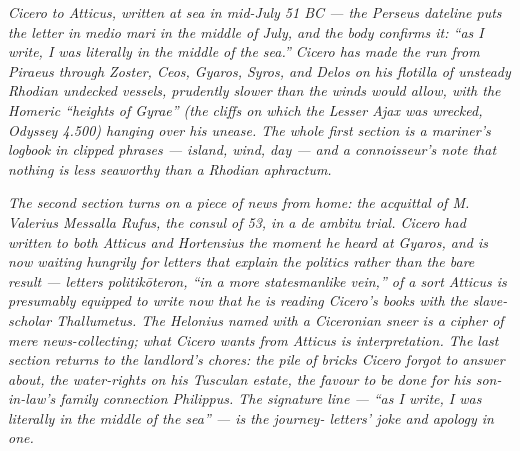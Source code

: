 
\textit{Cicero to Atticus, written at sea in mid-July 51 BC ---
the Perseus dateline puts the letter \textit{in medio mari}
in the middle of July, and the body confirms it: ``as I
write, I was literally in the middle of the sea.'' Cicero
has made the run from Piraeus through Zoster, Ceos, Gyaros,
Syros, and Delos on his flotilla of unsteady Rhodian
undecked vessels, prudently slower than the winds would
allow, with the Homeric ``heights of Gyrae'' (the cliffs
on which the Lesser Ajax was wrecked, \textit{Odyssey} 4.500)
hanging over his unease. The whole first section is a
mariner's logbook in clipped phrases --- island, wind, day
--- and a connoisseur's note that nothing is less seaworthy
than a Rhodian \textit{aphractum}.}

\textit{The second section turns on a piece of news from home:
the acquittal of M. Valerius Messalla Rufus, the consul of
53, in a \textit{de ambitu} trial. Cicero had written to
both Atticus and Hortensius the moment he heard at Gyaros,
and is now waiting hungrily for letters that explain the
politics rather than the bare result --- letters
\textit{politikōteron}, ``in a more statesmanlike vein,''
of a sort Atticus is presumably equipped to write now that
he is reading Cicero's books with the slave-scholar
Thallumetus. The Helonius named with a Ciceronian sneer is
a cipher of mere news-collecting; what Cicero wants from
Atticus is interpretation. The last section returns to the
landlord's chores: the pile of bricks Cicero forgot to
answer about, the water-rights on his Tusculan estate, the
favour to be done for his son-in-law's family connection
Philippus. The signature line --- ``as I write, I was
literally in the middle of the sea'' --- is the journey-
letters' joke and apology in one.}
